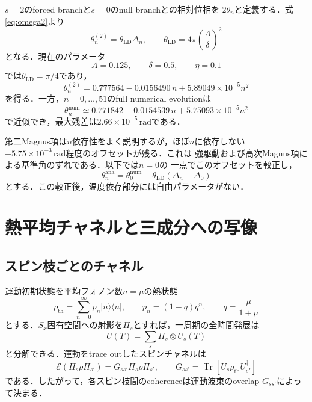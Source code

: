 \documentclass[dvipdfmx,a4paper,10pt]{jsarticle}
\newcommand{\tr}{\operatorname{Tr}}
\newcommand{\ket}[1]{\lvert #1\rangle}
\newcommand{\bra}[1]{\langle #1\rvert}
\begin{document}
$s=2$のforced branchと$s=0$のnull branchとの相対位相を
$2\theta_n$と定義する．式\eqref{eq:omega2}より
\begin{equation}
 \boxed{
 \theta_n^{(2)}
 =\theta_{\mathrm{LD}}\Delta_n,
 \qquad
 \theta_{\mathrm{LD}}
 =4\pi\left(\frac{A}{\delta}\right)^2
 }
 \label{eq:theta_n}
\end{equation}
となる．現在のパラメータ
\begin{equation}
 A=0.125,\qquad
 \delta=0.5,\qquad
 \eta=0.1
\end{equation}
では$\theta_{\mathrm{LD}}=\pi/4$であり，
\begin{equation}
 \theta_n^{(2)}
 =0.777564
 -0.0156490\,n
 +5.89049\times10^{-5}n^2
 \label{eq:theta_n_numerical_analytic}
\end{equation}
を得る．一方，$n=0,\ldots,51$のfull numerical evolutionは
\begin{equation}
 \theta_n^{\mathrm{num}}
 \simeq
 0.771842
 -0.0154539\,n
 +5.75093\times10^{-5}n^2
 \label{eq:theta_n_fit}
\end{equation}
で近似でき，最大残差は$2.66\times10^{-5}\,\mathrm{rad}$である．

第二Magnus項は$n$依存性をよく説明するが，ほぼ$n$に依存しない
$-5.75\times10^{-3}\,\mathrm{rad}$程度のオフセットが残る．これは
強駆動および高次Magnus項による基準角のずれである．以下では$n=0$の
一点でこのオフセットを較正し，
\begin{equation}
 \theta_n^{\mathrm{ana}}
 =
 \theta_0^{\mathrm{num}}
 +\theta_{\mathrm{LD}}(\Delta_n-\Delta_0)
 \label{eq:one_point_calibration}
\end{equation}
とする．この較正後，温度依存部分には自由パラメータがない．

\section{熱平均チャネルと三成分への写像}

\subsection{スピン枝ごとのチャネル}

運動初期状態を平均フォノン数$\bar n=\mu$の熱状態
\begin{equation}
 \rho_{\mathrm{th}}
 =\sum_{n=0}^{\infty}p_n\ket{n}\bra{n},
 \qquad
 p_n=(1-q)q^n,
 \qquad
 q=\frac{\mu}{1+\mu}
 \label{eq:thermal_distribution}
\end{equation}
とする．$S_x$固有空間への射影を$\Pi_s$とすれば，一周期の全時間発展は
\begin{equation}
 U(T)=\sum_s\Pi_s\otimes U_s(T)
\end{equation}
と分解できる．運動をtrace outしたスピンチャネルは
\begin{equation}
 \mathcal{E}
 \left(\Pi_s\rho\Pi_{s'}\right)
 =
 G_{ss'}\Pi_s\rho\Pi_{s'},
 \qquad
 G_{ss'}
 =\tr\left[
 U_s\rho_{\mathrm{th}}U_{s'}^\dagger
 \right]
 \label{eq:branch_channel}
\end{equation}
である．したがって，各スピン枝間のcoherenceは運動波束のoverlap
$G_{ss'}$によって決まる．
\end{document}
